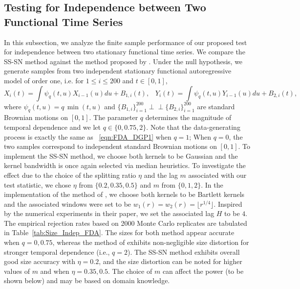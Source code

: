 \documentclass[11pt]{article}
\newcommand{\indep}{\perp \!\!\! \perp}
\theoremstyle{plain}
\theoremstyle{definition}
\theoremstyle{remark}
\begin{document}
\subsection{Testing for Independence between Two Functional Time Series}\label{sec:sim_Indep_FDA}
In this subsection, we analyze the finite sample performance of our proposed test for independence between two stationary functional time series. We compare the SS-SN method against the method proposed by \cite{horvath2015testing}. Under the null hypothesis, we generate samples from two independent stationary functional autoregressive model of order one, i.e. for $1\leq i \leq 200$ and $t \in [0,1]$,
\begin{equation}\label{eqn:FDA_DGP2}
   X_i(t)=\int \psi_q(t,u)X_{i-1}(u)du+B_{1,i}(t),\;\;\;Y_i(t)=\int \psi_q(t,u)Y_{i-1}(u)du+B_{2,i}(t), 
\end{equation}
where $\psi_q(t,u)=q\,\min(t,u)$ and $\{B_{1,i}\}_{i=1}^{200} \indep \{B_{2,i}\}_{i=1}^{200}$ are standard Brownian motions on $[0,1]$. The parameter $q$ determines the magnitude of temporal dependence and we let $q\in \{0, 0.75, 2\}$. Note that the data-generating process is exactly the same as ~\eqref{eqn:FDA_DGP1} when $q=1$; When $q=0$, the two samples correspond to  independent standard Brownian motions on $[0,1].$ 
To implement the SS-SN method, we choose both kernels to be Gaussian and the kernel bandwidth is once again selected via median heuristics. To investigate the effect due to the choice of the splitting ratio $\eta$ and the lag $m$ associated with our test statistic, we chose $\eta$ from $\{0.2, 0.35, 0.5\}$ and $m$ from $\{0,1,2\}.$ In the implementation of the method of \cite{horvath2015testing}, we choose both kernels to be Bartlett kernels and the associated windows were set to be $w_1(r)=w_2(r)=\lfloor r^{1/4}\rfloor.$ Inspired by the numerical experiments in their paper, we set the associated lag $H$ to be $4$. The empirical rejection rates based on 2000 Monte Carlo replicates are tabulated in Table~\ref{tab:Size_Indep_FDA}. The sizes for both method appear accurate when $q=0, 0.75$, whereas the method of \cite{horvath2015testing} exhibits non-negligible size distortion for stronger temporal dependence (i.e., $q=2$). The SS-SN method exhibits overall good size accuracy with $\eta=0.2$, and the size distortion can be noted for higher values of $m$ and when $\eta=0.35, 0.5$. The choice of $m$ can affect the power (to be shown below) and may be based on domain knowledge. \\
\end{document}
